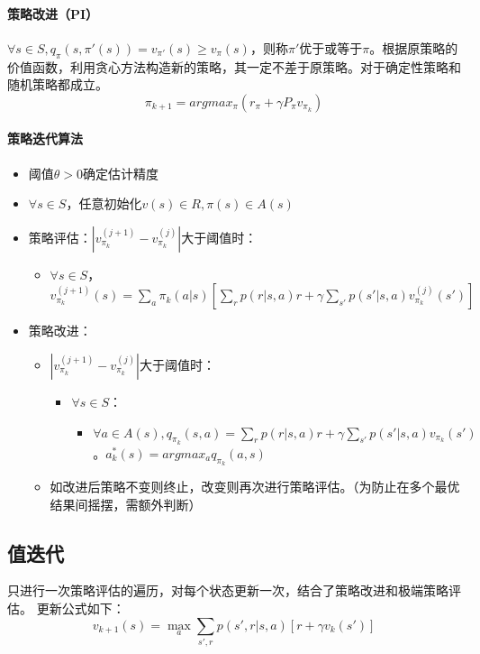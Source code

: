 \documentclass[
12pt, %
a4paper, 
oneside, %
headinclude,footinclude, %
]{scrartcl}
\begin{document}
\paragraph{策略改进（PI）}
$ \forall s \in S, q_{\pi}(s, \pi'(s)) = v_{\pi'}(s) \geq v_{\pi}(s) $，则称$ \pi' $优于或等于$ \pi $。根据原策略的价值函数，利用贪心方法构造新的策略，其一定不差于原策略。对于确定性策略和随机策略都成立。
$$ \pi_{k + 1} = argmax_{\pi}(r_{\pi} + \gamma P_{\pi}v_{\pi_k}) $$
\paragraph{策略迭代算法}
\begin{itemize}
\item 阈值$ \theta > 0 $确定估计精度
\item $ \forall s \in S $，任意初始化$ v(s) \in R, \pi(s)\in A(s) $
\item 策略评估：$ |v_{\pi_k}^{(j + 1)} - v_{\pi_k}^{(j)}| $大于阈值时：
\begin{itemize}
\item $ \forall s \in S $，$ v_{\pi_k}^{(j + 1)}(s) = \sum_a \pi_k(a|s)[\sum_r p(r|s, a)r + \gamma \sum_{s'}p(s'|s ,a)v_{\pi_k}^{(j)}(s')] $
\end{itemize}
\item 策略改进：
\begin{itemize}
\item  $ |v_{\pi_k}^{(j + 1)} - v_{\pi_k}^{(j)}| $大于阈值时：
\begin{itemize}
\item $ \forall s \in S $：
\begin{itemize}
\item $ \forall a \in A(s), q_{\pi_k}(s, a) = \sum_r p(r|s, a)r + \gamma \sum_{s'} p(s'|s, a)v_{\pi_k}(s') $。$ a^*_k(s) = argmax_a q_{\pi_k}(a, s) $
\end{itemize}
\end{itemize}
\item 如改进后策略不变则终止，改变则再次进行策略评估。（为防止在多个最优结果间摇摆，需额外判断）
\end{itemize}
\end{itemize}
\subsection{值迭代}
只进行一次策略评估的遍历，对每个状态更新一次，结合了策略改进和极端策略评估。
更新公式如下：
$$
v_{k + 1}(s) = \max_a \sum_{s', r} p(s', r|s, a)[r + \gamma v_k(s')]
$$
\end{document}
